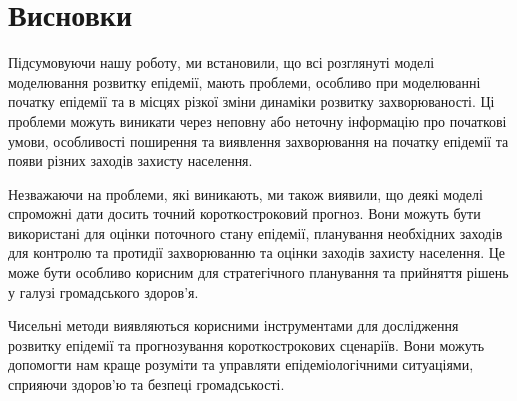 \chapter*{Висновки}


Підсумовуючи нашу роботу, ми встановили, що всі розглянуті моделі
моделювання розвитку епідемії, мають проблеми, особливо при моделюванні 
початку епідемії та в місцях різкої зміни динаміки розвитку захворюваності.
Ці проблеми можуть виникати через неповну або неточну інформацію про
початкові умови, особливості поширення та виявлення захворювання на початку
епідемії та появи різних заходів захисту населення.

Незважаючи на проблеми, які виникають, ми також виявили, що деякі 
моделі спроможні дати досить точний короткостроковий прогноз. 
Вони можуть бути використані для оцінки поточного стану епідемії, 
планування необхідних заходів для контролю та протидії захворюванню та 
оцінки заходів захисту населення.
Це може бути особливо корисним для стратегічного планування та 
прийняття рішень у галузі громадського здоров'я.

Чисельні методи виявляються корисними інструментами для дослідження
розвитку епідемії та прогнозування короткострокових сценаріїв. 
Вони можуть допомогти нам краще розуміти та управляти епідеміологічними
ситуаціями, сприяючи здоров'ю та безпеці громадськості.